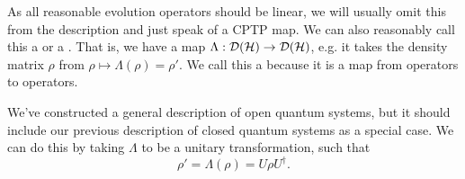 As all reasonable evolution operators should be linear, we will usually omit this from the description and just speak of a CPTP map. We can also reasonably call this a  or a . That is, we have a map $\Lambda:\mathcal{D}(\mathcal H)\to \mathcal{D}(\mathcal H)$, e.g. it takes the density matrix $\rho$ from $\rho\mapsto \Lambda(\rho)=\rho'$. We call this a  because it is a map from operators to operators.

\begin{exm}
    We've constructed a general description of open quantum systems, but it should include our previous description of closed quantum systems as a special case. We can do this by taking $\Lambda$ to be a unitary transformation, such that
    \begin{equation}
        \rho'=\Lambda(\rho)=U\rho U^\dagger.
    \end{equation}
\end{exm}

